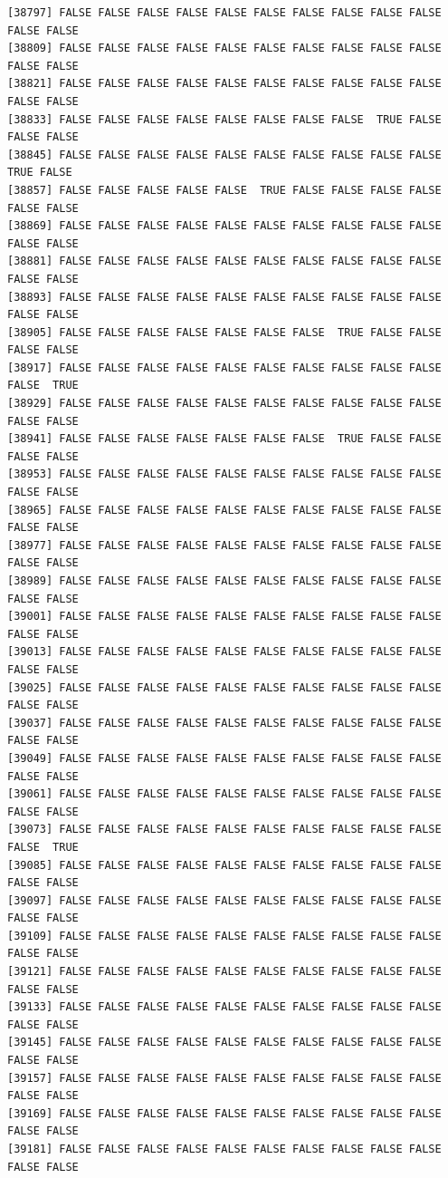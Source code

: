 \documentclass[
  a4paper,
  DIV=11,
  numbers=noendperiod]{scrartcl}
\begin{document}
\begin{verbatim}
[38797] FALSE FALSE FALSE FALSE FALSE FALSE FALSE FALSE FALSE FALSE FALSE FALSE
[38809] FALSE FALSE FALSE FALSE FALSE FALSE FALSE FALSE FALSE FALSE FALSE FALSE
[38821] FALSE FALSE FALSE FALSE FALSE FALSE FALSE FALSE FALSE FALSE FALSE FALSE
[38833] FALSE FALSE FALSE FALSE FALSE FALSE FALSE FALSE  TRUE FALSE FALSE FALSE
[38845] FALSE FALSE FALSE FALSE FALSE FALSE FALSE FALSE FALSE FALSE  TRUE FALSE
[38857] FALSE FALSE FALSE FALSE FALSE  TRUE FALSE FALSE FALSE FALSE FALSE FALSE
[38869] FALSE FALSE FALSE FALSE FALSE FALSE FALSE FALSE FALSE FALSE FALSE FALSE
[38881] FALSE FALSE FALSE FALSE FALSE FALSE FALSE FALSE FALSE FALSE FALSE FALSE
[38893] FALSE FALSE FALSE FALSE FALSE FALSE FALSE FALSE FALSE FALSE FALSE FALSE
[38905] FALSE FALSE FALSE FALSE FALSE FALSE FALSE  TRUE FALSE FALSE FALSE FALSE
[38917] FALSE FALSE FALSE FALSE FALSE FALSE FALSE FALSE FALSE FALSE FALSE  TRUE
[38929] FALSE FALSE FALSE FALSE FALSE FALSE FALSE FALSE FALSE FALSE FALSE FALSE
[38941] FALSE FALSE FALSE FALSE FALSE FALSE FALSE  TRUE FALSE FALSE FALSE FALSE
[38953] FALSE FALSE FALSE FALSE FALSE FALSE FALSE FALSE FALSE FALSE FALSE FALSE
[38965] FALSE FALSE FALSE FALSE FALSE FALSE FALSE FALSE FALSE FALSE FALSE FALSE
[38977] FALSE FALSE FALSE FALSE FALSE FALSE FALSE FALSE FALSE FALSE FALSE FALSE
[38989] FALSE FALSE FALSE FALSE FALSE FALSE FALSE FALSE FALSE FALSE FALSE FALSE
[39001] FALSE FALSE FALSE FALSE FALSE FALSE FALSE FALSE FALSE FALSE FALSE FALSE
[39013] FALSE FALSE FALSE FALSE FALSE FALSE FALSE FALSE FALSE FALSE FALSE FALSE
[39025] FALSE FALSE FALSE FALSE FALSE FALSE FALSE FALSE FALSE FALSE FALSE FALSE
[39037] FALSE FALSE FALSE FALSE FALSE FALSE FALSE FALSE FALSE FALSE FALSE FALSE
[39049] FALSE FALSE FALSE FALSE FALSE FALSE FALSE FALSE FALSE FALSE FALSE FALSE
[39061] FALSE FALSE FALSE FALSE FALSE FALSE FALSE FALSE FALSE FALSE FALSE FALSE
[39073] FALSE FALSE FALSE FALSE FALSE FALSE FALSE FALSE FALSE FALSE FALSE  TRUE
[39085] FALSE FALSE FALSE FALSE FALSE FALSE FALSE FALSE FALSE FALSE FALSE FALSE
[39097] FALSE FALSE FALSE FALSE FALSE FALSE FALSE FALSE FALSE FALSE FALSE FALSE
[39109] FALSE FALSE FALSE FALSE FALSE FALSE FALSE FALSE FALSE FALSE FALSE FALSE
[39121] FALSE FALSE FALSE FALSE FALSE FALSE FALSE FALSE FALSE FALSE FALSE FALSE
[39133] FALSE FALSE FALSE FALSE FALSE FALSE FALSE FALSE FALSE FALSE FALSE FALSE
[39145] FALSE FALSE FALSE FALSE FALSE FALSE FALSE FALSE FALSE FALSE FALSE FALSE
[39157] FALSE FALSE FALSE FALSE FALSE FALSE FALSE FALSE FALSE FALSE FALSE FALSE
[39169] FALSE FALSE FALSE FALSE FALSE FALSE FALSE FALSE FALSE FALSE FALSE FALSE
[39181] FALSE FALSE FALSE FALSE FALSE FALSE FALSE FALSE FALSE FALSE FALSE FALSE

\end{verbatim}
\end{document}
